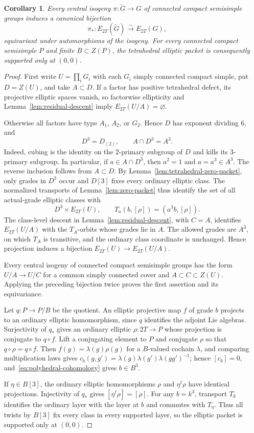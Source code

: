 \documentclass[11pt,a4paper,reqno]{amsart}
\theoremstyle{plain}
\newtheorem{corollary}[theorem]{Corollary}
\theoremstyle{definition}
\theoremstyle{remark}
\numberwithin{equation}{section}
\begin{document}
\begin{corollary}\label{cor:tetrahedral-lifting}
Every central isogeny $\pi\colon\widetilde G\to G$ of connected compact semisimple groups induces a canonical bijection
\[
\pi_*\colon E_{2T}(\widetilde G)\xrightarrow{\sim}E_{2T}(G),
\]
equivariant under automorphisms of the isogeny. For every connected compact semisimple $P$ and finite $B\subset Z(P)$, the tetrahedral elliptic packet is consequently supported only at $(0,0)$.
\end{corollary}
\begin{proof}
First write $U=\prod_iG_i$ with each $G_i$ simply connected compact simple, put $D=Z(U)$, and take $A\subset D$. If a factor has positive tetrahedral defect, its projective elliptic spaces vanish, so factorwise ellipticity and Lemma~\ref{lem:residual-descent} imply $E_{2T}(U/A)=\varnothing$.

Otherwise all factors have type $A_1$, $A_2$, or $G_2$. Hence $D$ has exponent dividing $6$, and
\[
D^3=D_{(2)},\qquad A\cap D^3=A^3.
\]
Indeed, cubing is the identity on the $2$-primary subgroup of $D$ and kills its $3$-primary subgroup. In particular, if $a\in A\cap D^3$, then $a^2=1$ and $a=a^3\in A^3$. The reverse inclusion follows from $A\subset D$. By Lemma~\ref{lem:tetrahedral-zero-packet}, only grades in $D^3$ occur and $D[3]$ fixes every ordinary elliptic class. The normalized transports of Lemma~\ref{lem:zero-packet} thus identify the set of all actual-grade elliptic classes with
\[
D^3\times E_{2T}(U),
\qquad
T_a(b,[\rho])=(a^3b,[\rho]).
\]
The class-level descent in Lemma~\ref{lem:residual-descent}, with $C=A$, identifies $E_{2T}(U/A)$ with the $T_A$-orbits whose grades lie in $A$. The allowed grades are $A^3$, on which $T_A$ is transitive, and the ordinary class coordinate is unchanged. Hence projection induces a bijection $E_{2T}(U)\to E_{2T}(U/A)$.

Every central isogeny of connected compact semisimple groups has the form $U/A\to U/C$ for a common simply connected cover and $A\subset C\subset Z(U)$. Applying the preceding bijection twice proves the first assertion and its equivariance.

Let $q\colon P\to P/B$ be the quotient. An elliptic projective map $f$ of grade $b$ projects to an ordinary elliptic homomorphism, since $q$ identifies the adjoint Lie algebras. Surjectivity of $q_*$ gives an ordinary elliptic $\rho\colon 2T\to P$ whose projection is conjugate to $q\circ f$. Lift a conjugating element to $P$ and conjugate $\rho$ so that $q\circ\rho=q\circ f$. Then $f(g)=\lambda(g)\rho(g)$ for a $B$-valued cochain $\lambda$, and comparing multiplication laws gives $c_b(g,g')=\lambda(g)\lambda(g')\lambda(gg')^{-1}$; hence $[c_b]=0$, and~\eqref{eq:polyhedral-cohomology} gives $b\in B^3$.

If $\eta\in B[3]$, the ordinary elliptic homomorphisms $\rho$ and $\eta^\ell\rho$ have identical projections. Injectivity of $q_*$ gives $[\eta^\ell\rho]=[\rho]$. For any $b=k^3$, transport $T_k$ identifies the ordinary layer with the layer at $b$ and commutes with $T_\eta$. Thus all twists by $B[3]$ fix every class in every supported layer, so the elliptic packet is supported only at $(0,0)$.
\end{proof}
\end{document}
